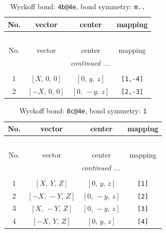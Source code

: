 \documentclass[fleqn,8pt]{jsarticle}
\begin{document}
\renewcommand{\arraystretch}{1.2}
\begin{longtable}{cccc}
\caption{Wyckoff bond: {\tt 4b@4e}, bond symmetry: {\tt m..}}
 \\
 \hline \hline
No. & vector & center & mapping \\ \hline \endfirsthead

\multicolumn{3}{l}{\tablename\ \thetable{}} \\
 \hline \hline
No. & vector & center & mapping \\ \hline \endhead

 \hline \hline
\multicolumn{3}{r}{\footnotesize\it continued ...} \\ \endfoot

 \hline \hline
\multicolumn{3}{r}{} \\ \endlastfoot

1 & $\left[ X,\, 0,\, 0 \right]$ & $\left[ 0,\, y,\, z \right]$ & {\tt [1,-4]} \\ \hline
2 & $\left[ - X,\, 0,\, 0 \right]$ & $\left[ 0,\, - y,\, z \right]$ & {\tt [2,-3]} \\
\end{longtable}
\renewcommand{\arraystretch}{1.2}
\begin{longtable}{cccc}
\caption{Wyckoff bond: {\tt 8c@4e}, bond symmetry: {\tt 1}}
 \\
 \hline \hline
No. & vector & center & mapping \\ \hline \endfirsthead

\multicolumn{3}{l}{\tablename\ \thetable{}} \\
 \hline \hline
No. & vector & center & mapping \\ \hline \endhead

 \hline \hline
\multicolumn{3}{r}{\footnotesize\it continued ...} \\ \endfoot

 \hline \hline
\multicolumn{3}{r}{} \\ \endlastfoot

1 & $\left[ X,\, Y,\, Z \right]$ & $\left[ 0,\, y,\, z \right]$ & {\tt [1]} \\ \hline
2 & $\left[ - X,\, - Y,\, Z \right]$ & $\left[ 0,\, - y,\, z \right]$ & {\tt [2]} \\ \hline
3 & $\left[ X,\, - Y,\, Z \right]$ & $\left[ 0,\, - y,\, z \right]$ & {\tt [3]} \\ \hline
4 & $\left[ - X,\, Y,\, Z \right]$ & $\left[ 0,\, y,\, z \right]$ & {\tt [4]} \\
\end{longtable}
\end{document}
